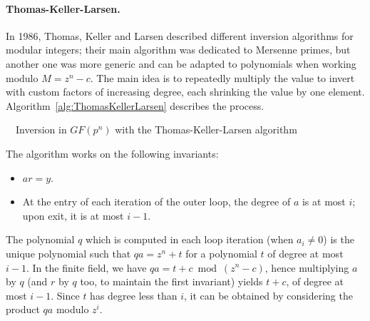 \documentclass{llncs}
\newcommand{\GF}{GF}
\begin{document}
\paragraph{Thomas-Keller-Larsen.}

In 1986, Thomas, Keller and Larsen described different inversion
algorithms for modular integers\cite{ThoKelLar1986}; their main
algorithm was dedicated to Mersenne primes, but another one was more
generic and can be adapted to polynomials when working modulo $M =
z^n-c$. The main idea is to repeatedly multiply the value to invert
with custom factors of increasing degree, each shrinking the value by
one element. Algorithm~\ref{alg:ThomasKellerLarsen} describes the
process.

\begin{algorithm}[H]
    \caption{\ \ Inversion in $\GF(p^n)$ with the Thomas-Keller-Larsen
    algorithm}\label{alg:ThomasKellerLarsen}
    \begin{algorithmic}[1]
        \Require{$y \in \GF(p^n)$, $y\neq 0$, $\GF(p^n) = \GF(p)[z]/(z^n-c)$}
                \EndFor
            \EndIf
        \EndFor
    \end{algorithmic}
\end{algorithm}

The algorithm works on the following invariants:
\begin{itemize}

    \item $ar = y$.

    \item At the entry of each iteration of the outer loop, the degree of
    $a$ is at most $i$; upon exit, it is at most $i-1$.

\end{itemize}
The polynomial $q$ which is computed in each loop iteration (when $a_i
\neq 0$) is the unique polynomial such that $qa = z^n + t$ for a
polynomial $t$ of degree at most $i-1$. In the finite field, we have
$qa = t + c \bmod (z^n-c)$, hence multiplying $a$ by $q$ (and $r$ by $q$
too, to maintain the first invariant) yields $t+c$, of degree at most
$i-1$. Since $t$ has degree less than $i$, it can be obtained by
considering the product $qa$ modulo $z^i$.
\end{document}
